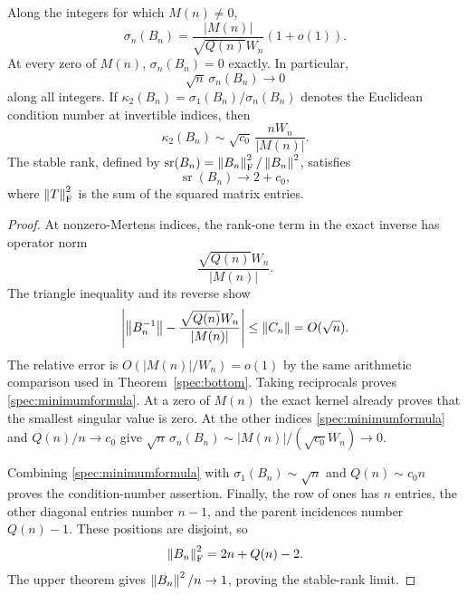 \begin{theorem}\label{spec:minimum}
Along the integers for which $M(n)\ne0$,
\begin{equation}\label{spec:minimumformula}
 \sigma_n(B_n)=\frac{|M(n)|}{\sqrt{Q(n)}W_n}(1+o(1)).
\end{equation}
At every zero of $M(n)$, $\sigma_n(B_n)=0$ exactly. In particular,
\[
 \sqrt n\,\sigma_n(B_n)\longrightarrow0
\]
along all integers. If $\kappa_2(B_n)=\sigma_1(B_n)/\sigma_n(B_n)$ denotes the Euclidean condition number at invertible indices, then
\[
 \kappa_2(B_n)\sim\sqrt{c_0}\,\frac{nW_n}{|M(n)|}.
\]
The stable rank, defined by $\operatorname{sr}(B_n)=\left\lVert B_n\right\rVert_{\mathrm F}^2/\left\lVert B_n\right\rVert^2$, satisfies
\[
 \operatorname{sr}(B_n)\longrightarrow2+c_0,
\]
where $\left\lVert T\right\rVert_{\mathrm F}^2$ is the sum of the squared matrix entries.
\end{theorem}

\begin{proof}
At nonzero-Mertens indices, the rank-one term in the exact inverse has operator norm
\[
 \frac{\sqrt{Q(n)}W_n}{|M(n)|}.
\]
The triangle inequality and its reverse show
\[
 \left|\left\lVert B_n^{-1}\right\rVert-\frac{\sqrt{Q(n)}W_n}{|M(n)|}\right|
 \le\left\lVert C_n\right\rVert=O(\sqrt n).
\]
The relative error is $O(|M(n)|/W_n)=o(1)$ by the same arithmetic comparison used in Theorem~\ref{spec:bottom}. Taking reciprocals proves \eqref{spec:minimumformula}. At a zero of $M(n)$ the exact kernel already proves that the smallest singular value is zero. At the other indices \eqref{spec:minimumformula} and $Q(n)/n\to c_0$ give $\sqrt n\,\sigma_n(B_n)\sim |M(n)|/(\sqrt{c_0}W_n)\to0$.

Combining \eqref{spec:minimumformula} with $\sigma_1(B_n)\sim\sqrt n$ and $Q(n)\sim c_0n$ proves the condition-number assertion. Finally, the row of ones has $n$ entries, the other diagonal entries number $n-1$, and the parent incidences number $Q(n)-1$. These positions are disjoint, so
\[
 \left\lVert B_n\right\rVert_{\mathrm F}^2=2n+Q(n)-2.
\]
The upper theorem gives $\left\lVert B_n\right\rVert^2/n\to1$, proving the stable-rank limit.
\end{proof}

